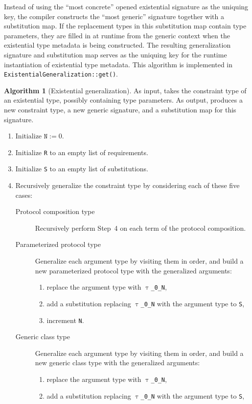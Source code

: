 \documentclass[a4paper,headsepline,bibliography=totoc,toc=flat,fleqn,twoside=semi]{scrbook}
\theoremstyle{definition}
\theoremstyle{definition}
\theoremstyle{definition}
\newtheorem{algorithm}{Algorithm}[chapter]
\newcommand{\ttgp}[2]{\texttt{$\uptau$\_#1\_#2}}
\begin{document}
Instead of using the ``most concrete'' opened existential signature as the uniquing key, the compiler constructs the ``most generic'' signature together with a substitution map. If the replacement types in this substitution map contain type parameters, they are filled in at runtime from the generic context when the existential type metadata is being constructed. The resulting generalization signature and substitution map serves as the uniquing key for the runtime instantiation of existential type metadata. This algorithm is implemented in \texttt{ExistentialGeneralization::get()}.

\begin{algorithm}[Existential generalization]\label{existentialgeneralizationalgo}
As input, takes the constraint type of an existential type, possibly containing type parameters. As output, produces a new constraint type, a new generic signature, and a substitution map for this signature.
\begin{enumerate}
\item Initialize $\texttt{N}:=0$.
\item Initialize \texttt{R} to an empty list of requirements.
\item Initialize \texttt{S} to an empty list of substitutions.
\item Recursively generalize the constraint type by considering each of these five cases:
\begin{description}
\item [Protocol composition type] Recursively perform Step~4 on each term of the protocol composition.
\item [Parameterized protocol type] Generalize each argument type by visiting them in order, and build a new parameterized protocol type with the generalized arguments:
\begin{enumerate}
\item replace the argument type with \ttgp{0}{N},
\item add a substitution replacing \ttgp{0}{N} with the argument type to \texttt{S},
\item increment \texttt{N}.
\end{enumerate}
\item [Generic class type] Generalize each argument type by visiting them in order, and build a new generic class type with the generalized arguments:
\begin{enumerate}
\item replace the argument type with \ttgp{0}{N},
\item add a substitution replacing \ttgp{0}{N} with the argument type to \texttt{S},

\end{enumerate}
\end{description}
\end{enumerate}
\end{algorithm}
\end{document}
